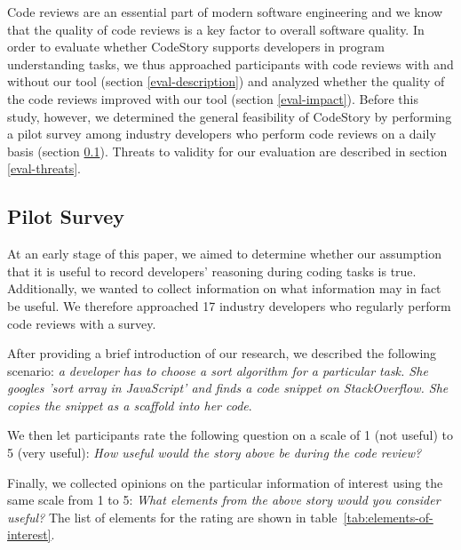 \documentclass[../manifest.tex]{subfiles}
\begin{document}
Code reviews are an essential part of modern software engineering and we know that the quality of code reviews is a key factor to overall software quality. In order to evaluate whether CodeStory supports developers in program understanding tasks, we thus approached participants with code reviews with and without our tool (section \ref{eval-description}) and analyzed whether the quality of the code reviews improved with our tool (section \ref{eval-impact}). Before this study, however, we determined the general feasibility of CodeStory by performing a pilot survey among industry developers who perform code reviews on a daily basis (section \ref{eval-survey}). Threats to validity for our evaluation are described in section \ref{eval-threats}.

\subsection{Pilot Survey} \label{eval-survey}

At an early stage of this paper, we aimed to determine whether our assumption that it is useful to record developers' reasoning during coding tasks is true. Additionally, we wanted to collect information on what information may in fact be useful. We therefore approached 17 industry developers who regularly perform code reviews with a survey. 

After providing a brief introduction of our research, we described the following scenario: \textit{a developer has to choose a sort algorithm for a particular task. She googles 'sort array in JavaScript' and finds a code snippet on StackOverflow. She copies the snippet as a scaffold into her code}.

We then let participants rate the following question on a scale of 1 (not useful) to 5 (very useful): \textit{How useful would the story above be during the code review?}

Finally, we collected opinions on the particular information of interest using the same scale from 1 to 5: \textit{What elements from the above story would you consider useful?} The list of elements for the rating are shown in table~\ref{tab:elements-of-interest}.
\end{document}
